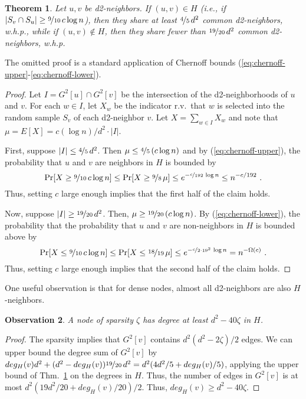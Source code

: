 \documentclass[12pt]{article}
\newtheorem{theorem}{Theorem}[section]
\newtheorem{observation}[theorem]{Observation}
\newcommand{\myfrac}[2]{\nicefrac{#1}{#2}\,}
\begin{document}
\begin{theorem}
Let $u,v$ be d2-neighbors.
If $(u,v) \in H$ (i.e., if $|S_v \cap S_u| \ge \myfrac{9}{10} c \log n$), then they share at least $\nicefrac{4}{5}\, d^2$ common d2-neighbors, w.h.p.,
while if $(u,v) \not\in H$, then they share fewer than $\nicefrac{19}{20}\, d^2$ common d2-neighbors, w.h.p.
\label{thm:similarity}
\end{theorem}

The omitted proof is a standard application of Chernoff bounds (\ref{eq:chernoff-upper}-\ref{eq:chernoff-lower}).
{\small
\begin{proof}
Let $I = G^2[u]\cap G^2[v]$ be the intersection of the d2-neighborhoods of $u$ and $v$. 
For each $w \in I$, let $X_w$ be the indicator r.v.\ that $w$ is
selected into the random sample $S_v$ of each d2-neighbor $v$.
Let $X = \sum_{w \in I} X_w$ and note 
that $\mu = E[X] = c (\log n)/d^2 \cdot |I|$.

First, suppose $|I| \le \nicefrac{4}{5}\, d^2$.
Then $\mu \le \nicefrac{4}{5}\, (c\log n)$ and
by (\ref{eq:chernoff-upper}), the probability that $u$ and $v$ are neighbors in $H$ is bounded by
\[ \Pr[X \ge \nicefrac{9}{10}\, c \log n]
\le \Pr[X \ge \nicefrac{9}{8}\,\mu] \le e^{-\nicefrac{c}{192}\, \log n} \le n^{-c/192}\ . \]
Thus, setting $c$ large enough implies that the first half of the claim holds.

Now, suppose $|I| \ge \nicefrac{19}{20}\, d^2$.
Then, $\mu \ge \nicefrac{19}{20}\, (c\log n)$.
By (\ref{eq:chernoff-lower}), the probability that 
the probability that $u$ and $v$ are non-neighbors in $H$ is bounded above by
\[ \Pr[X \le \nicefrac{9}{10}\, c \log n]
\le \Pr[X \le \nicefrac{18}{19}\,\mu] \le e^{-\nicefrac{c}{2\cdot 19^2}\, \log n} = n^{-\Omega(c)}\ . \]
Thus, setting $c$ large enough implies that the second half of the claim holds.
\end{proof}
}


One useful observation is that for dense nodes, almost all d2-neighbors are also $H$-neighbors.

\begin{observation}
A node of sparsity $\zeta$ has degree at least $d^2 - 40\zeta$ in $H$. 
\label{obs:h-degree}
\end{observation}
 
 \begin{proof}
 The sparsity implies that $G^2[v]$ contains $d^2 (d^2 - 2\zeta)/2$ edges. We can upper bound the degree sum of $G^2[v]$ by $deg_H(v) d^2 + (d^2 - deg_H(v)) \nicefrac{19}{20}\, d^2 = d^2(4d^2/5 + deg_H(v)/5)$, applying the upper bound of Thm.~\ref{thm:similarity} on the degrees in $H$. Thus, the number of edges in $G^2[v]$ is at most $d^2(19d^2/20 + deg_H(v)/20)/2$. Thus, $deg_H(v) \ge d^2 - 40\zeta$.
\end{proof}
 
\end{document}
